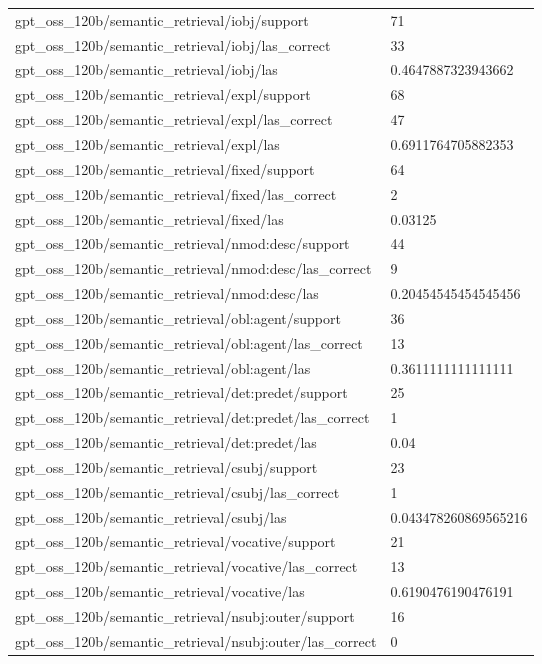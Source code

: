 \begin{tabular}{ll}
gpt\_oss\_120b/semantic\_retrieval/iobj/support & 71 \\
gpt\_oss\_120b/semantic\_retrieval/iobj/las\_correct & 33 \\
gpt\_oss\_120b/semantic\_retrieval/iobj/las & 0.4647887323943662 \\
gpt\_oss\_120b/semantic\_retrieval/expl/support & 68 \\
gpt\_oss\_120b/semantic\_retrieval/expl/las\_correct & 47 \\
gpt\_oss\_120b/semantic\_retrieval/expl/las & 0.6911764705882353 \\
gpt\_oss\_120b/semantic\_retrieval/fixed/support & 64 \\
gpt\_oss\_120b/semantic\_retrieval/fixed/las\_correct & 2 \\
gpt\_oss\_120b/semantic\_retrieval/fixed/las & 0.03125 \\
gpt\_oss\_120b/semantic\_retrieval/nmod:desc/support & 44 \\
gpt\_oss\_120b/semantic\_retrieval/nmod:desc/las\_correct & 9 \\
gpt\_oss\_120b/semantic\_retrieval/nmod:desc/las & 0.20454545454545456 \\
gpt\_oss\_120b/semantic\_retrieval/obl:agent/support & 36 \\
gpt\_oss\_120b/semantic\_retrieval/obl:agent/las\_correct & 13 \\
gpt\_oss\_120b/semantic\_retrieval/obl:agent/las & 0.3611111111111111 \\
gpt\_oss\_120b/semantic\_retrieval/det:predet/support & 25 \\
gpt\_oss\_120b/semantic\_retrieval/det:predet/las\_correct & 1 \\
gpt\_oss\_120b/semantic\_retrieval/det:predet/las & 0.04 \\
gpt\_oss\_120b/semantic\_retrieval/csubj/support & 23 \\
gpt\_oss\_120b/semantic\_retrieval/csubj/las\_correct & 1 \\
gpt\_oss\_120b/semantic\_retrieval/csubj/las & 0.043478260869565216 \\
gpt\_oss\_120b/semantic\_retrieval/vocative/support & 21 \\
gpt\_oss\_120b/semantic\_retrieval/vocative/las\_correct & 13 \\
gpt\_oss\_120b/semantic\_retrieval/vocative/las & 0.6190476190476191 \\
gpt\_oss\_120b/semantic\_retrieval/nsubj:outer/support & 16 \\
gpt\_oss\_120b/semantic\_retrieval/nsubj:outer/las\_correct & 0 \\

\end{tabular}
